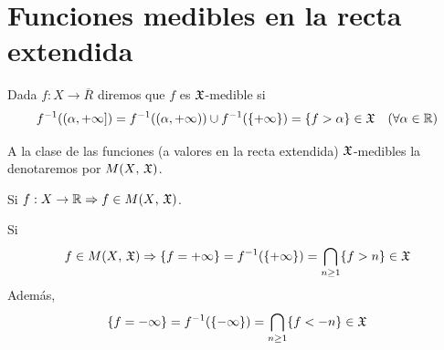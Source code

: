 \section{Funciones medibles en la recta extendida}

\begin{definition}
    Dada \(f: X \to \overline{R}\) diremos que \(f\) es \(\mathfrak{X}\)-medible si
    \begin{equation*}
        f^{-1}((\alpha, +\infty]) = f^{-1}((\alpha, +\infty)) \cup f^{-1}(\{ +\infty \}) = \{ f > \alpha \} \in \mathfrak{X} \quad (\forall \alpha \in \mathbb{R})
    \end{equation*}
\end{definition}

A la clase de las funciones (a valores en la recta extendida) \(\mathfrak{X}\)-medibles la denotaremos por \(M(X \text{, } \mathfrak{X})\).

\begin{note}
    Si \(f: X \to \mathbb{R} \Rightarrow f \in M(X \text{, } \mathfrak{X})\).
\end{note}

\begin{note}
    Si \begin{equation*}f \in M(X\text{, } \mathfrak{X}) \Rightarrow \{ f = +\infty \} = f^{-1}(\{ +\infty \}) = \bigcap_{n \geq 1} \{ f > n \} \in \mathfrak{X}\end{equation*}
    Además, \begin{equation*}\{ f = -\infty \} = f^{-1}(\{ -\infty \}) = \bigcap_{n \geq 1} \{ f < -n \} \in \mathfrak{X}\end{equation*}
\end{note}


